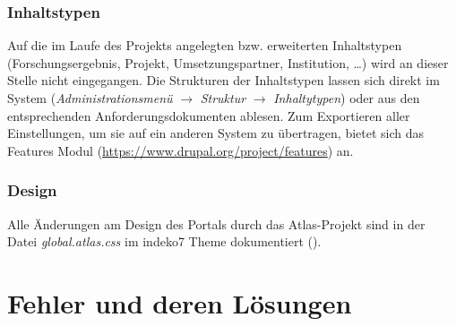 \subsubsection{Inhaltstypen}\label{subsub:inhaltstypen}
Auf die im Laufe des Projekts angelegten bzw. erweiterten Inhaltstypen (Forschungsergebnis, Projekt, Umsetzungspartner, Institution, \dots) wird an dieser Stelle nicht eingegangen. Die Strukturen der Inhaltstypen lassen sich direkt im System (\textit{Administrationsmenü} $\rightarrow$ \textit{Struktur} $\rightarrow$  \textit{Inhaltytypen}) oder aus den entsprechenden Anforderungsdokumenten ablesen. Zum Exportieren aller Einstellungen, um sie auf ein anderen System zu übertragen, bietet sich \zB das Features Modul (\url{https://www.drupal.org/project/features}) an. 




\subsubsection{Design}\label{subsub:cssdesign}
Alle Änderungen am Design des Portals durch das Atlas-Projekt sind in der Datei \textit{global.atlas.css} im indeko7 Theme dokumentiert ().




\newpage
\section{Fehler und deren Lösungen}\label{sec:problems}

